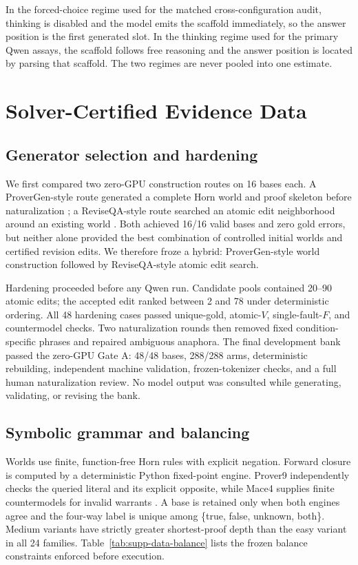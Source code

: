 \documentclass[letterpaper]{article}
\begin{document}
In the forced-choice regime used for the matched cross-configuration audit, thinking is disabled and the model emits the scaffold immediately, so the answer position is the first generated slot. In the thinking regime used for the primary Qwen assays, the scaffold follows free reasoning and the answer position is located by parsing that scaffold. The two regimes are never pooled into one estimate.

\section{Solver-Certified Evidence Data}
\label{supp:data}

\subsection{Generator selection and hardening}

We first compared two zero-GPU construction routes on 16 bases each.  A ProverGen-style route generated a complete Horn world and proof skeleton before naturalization \citep{qi2025provergen}; a ReviseQA-style route searched an atomic edit neighborhood around an existing world \citep{helwe2025reviseqa}.  Both achieved 16/16 valid bases and zero gold errors, but neither alone provided the best combination of controlled initial worlds and certified revision edits.  We therefore froze a hybrid: ProverGen-style world construction followed by ReviseQA-style atomic edit search.

Hardening proceeded before any Qwen run.  Candidate pools contained 20--90 atomic edits; the accepted edit ranked between 2 and 78 under deterministic ordering.  All 48 hardening cases passed unique-gold, atomic-$V$, single-fault-$F$, and countermodel checks.  Two naturalization rounds then removed fixed condition-specific phrases and repaired ambiguous anaphora.  The final development bank passed the zero-GPU Gate A: 48/48 bases, 288/288 arms, deterministic rebuilding, independent machine validation, frozen-tokenizer checks, and a full human naturalization review.  No model output was consulted while generating, validating, or revising the bank.

\subsection{Symbolic grammar and balancing}

Worlds use finite, function-free Horn rules with explicit negation.  Forward closure is computed by a deterministic Python fixed-point engine.  Prover9 independently checks the queried literal and its explicit opposite, while Mace4 supplies finite countermodels for invalid warrants \citep{mccune2010prover9mace4}.  A base is retained only when both engines agree and the four-way label is unique among \{true, false, unknown, both\}.  Medium variants have strictly greater shortest-proof depth than the easy variant in all 24 families. Table~\ref{tab:supp-data-balance} lists the frozen balance constraints enforced before execution.
\end{document}
